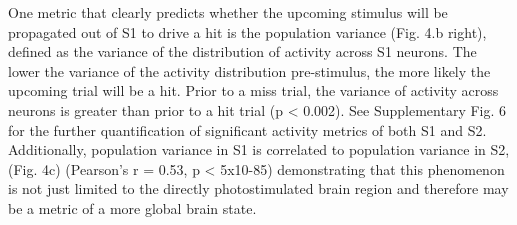 One metric that clearly predicts whether the upcoming stimulus will be propagated out of S1 to drive a hit is the population variance (Fig. 4.b right), defined as the variance of the distribution of activity across S1 neurons. The lower the variance of the activity distribution pre-stimulus, the more likely the upcoming trial will be a hit. Prior to a miss trial, the variance of activity across neurons is greater than prior to a hit trial (p < 0.002). See Supplementary Fig. 6 for the further quantification of significant activity metrics of both S1 and S2.  Additionally, population variance in S1 is correlated to population variance in S2, (Fig. 4c) (Pearson’s r = 0.53, p < 5x10-85) demonstrating that this phenomenon is not just limited to the directly photostimulated brain region and therefore may be a metric of a more global brain state.


